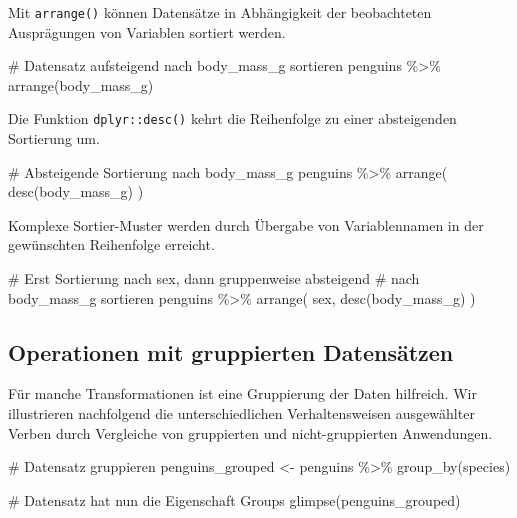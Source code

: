 \documentclass[
  a4paper,
  DIV=11,
  oneside]{scrreprt}
\newenvironment{Shaded}{\begin{snugshade}}{\end{snugshade}}
\newcommand{\NormalTok}[1]{\textcolor[rgb]{0.00,0.23,0.31}{#1}}
\begin{document}
Mit \texttt{arrange()} können Datensätze in Abhängigkeit der
beobachteten Ausprägungen von Variablen sortiert werden.

\begin{Shaded}
\begin{Highlighting}[]
\NormalTok{\# Datensatz aufsteigend nach \textquotesingle{}body\_mass\_g\textquotesingle{} sortieren}
\NormalTok{penguins \%\textgreater{}\% }
\NormalTok{  arrange(body\_mass\_g)}
\end{Highlighting}
\end{Shaded}

Die Funktion \texttt{dplyr::desc()} kehrt die Reihenfolge zu einer
absteigenden Sortierung um.

\begin{Shaded}
\begin{Highlighting}[]
\NormalTok{\# Absteigende Sortierung nach \textquotesingle{}body\_mass\_g\textquotesingle{}}
\NormalTok{penguins \%\textgreater{}\% }
\NormalTok{  arrange(}
\NormalTok{    desc(body\_mass\_g)}
\NormalTok{  )}
\end{Highlighting}
\end{Shaded}

Komplexe Sortier-Muster werden durch Übergabe von Variablennamen in der
gewünschten Reihenfolge erreicht.

\begin{Shaded}
\begin{Highlighting}[]
\NormalTok{\# Erst Sortierung nach \textquotesingle{}sex\textquotesingle{}, dann gruppenweise absteigend }
\NormalTok{\# nach \textquotesingle{}body\_mass\_g\textquotesingle{} sortieren}
\NormalTok{penguins \%\textgreater{}\% }
\NormalTok{  arrange(}
\NormalTok{    sex, desc(body\_mass\_g)}
\NormalTok{  )}
\end{Highlighting}
\end{Shaded}

\subsection{Operationen mit gruppierten
Datensätzen}\label{operationen-mit-gruppierten-datensuxe4tzen}

Für manche Transformationen ist eine Gruppierung der Daten hilfreich.
Wir illustrieren nachfolgend die unterschiedlichen Verhaltensweisen
ausgewählter Verben durch Vergleiche von gruppierten und
nicht-gruppierten Anwendungen.

\begin{Shaded}
\begin{Highlighting}[]
\NormalTok{\# Datensatz gruppieren}
\NormalTok{penguins\_grouped \textless{}{-} penguins \%\textgreater{}\% }
\NormalTok{  group\_by(species)}

\NormalTok{\# Datensatz hat nun die Eigenschaft \textquotesingle{}Groups\textquotesingle{}}
\NormalTok{glimpse(penguins\_grouped)}
\end{Highlighting}
\end{Shaded}
\end{document}
